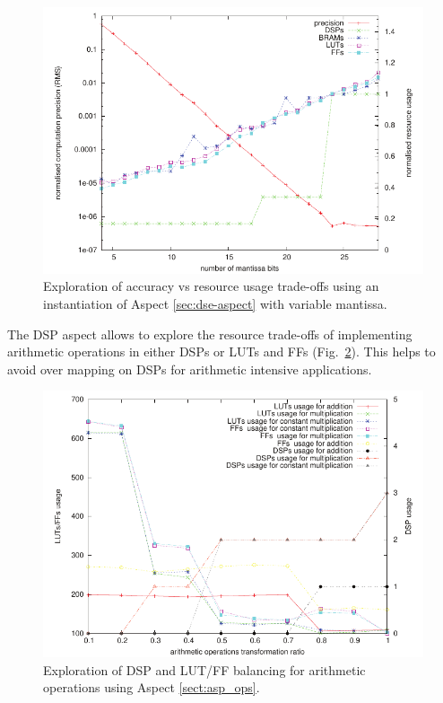 \begin{figure}[!h]
\includegraphics[scale=0.7]{figs/pre}
\caption{Exploration of accuracy vs resource usage trade-offs using an
  instantiation of Aspect \ref{sec:dse-aspect} with variable
  mantissa.}
\label{fig:precision}
  \vspace{-2mm}
\end{figure}

The DSP aspect allows to explore the resource trade-offs of
implementing arithmetic operations in either DSPs or LUTs and FFs
(Fig.~\ref{fig:arith}). This helps to avoid over mapping on DSPs for
arithmetic intensive applications.

\begin{figure}[!h]
\includegraphics[scale=0.7]{figs/arith}
\caption{Exploration of DSP and LUT/FF balancing for arithmetic
  operations using Aspect \ref{sect:asp_ops}.}
\label{fig:arith}
  \vspace{-2mm}
\end{figure}


